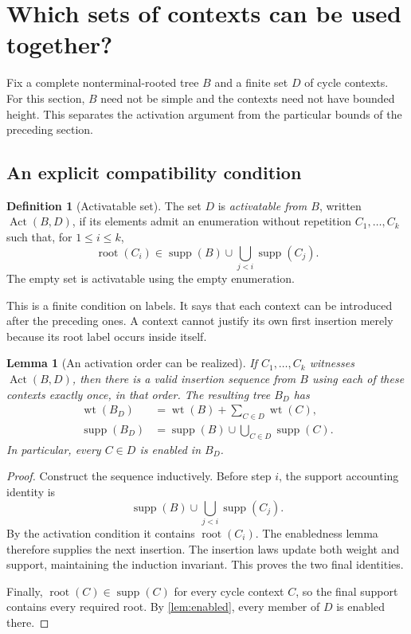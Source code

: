 \documentclass[11pt,a4paper]{article}
\numberwithin{equation}{section}
\theoremstyle{plain}
\newtheorem{lemma}[theorem]{Lemma}
\theoremstyle{definition}
\newtheorem{definition}[theorem]{Definition}
\theoremstyle{remark}
\newcommand{\wt}{\operatorname{wt}}
\newcommand{\supp}{\operatorname{supp}}
\newcommand{\rt}{\operatorname{root}}
\newcommand{\Act}{\operatorname{Act}}
\begin{document}
\section{Which sets of contexts can be used together?}\label{sec:activation}

Fix a complete nonterminal-rooted tree $B$ and a finite set $D$ of cycle contexts. For this section, $B$ need not be simple and the contexts need not have bounded height. This separates the activation argument from the particular bounds of the preceding section.

\subsection{An explicit compatibility condition}
\begin{definition}[Activatable set]\label{def:activation}
The set $D$ is \emph{activatable from $B$}, written $\Act(B,D)$, if its elements admit an enumeration without repetition $C_1,\ldots,C_k$ such that, for $1\leq i\leq k$,
\begin{equation}\label{eq:activation}
\rt(C_i)\in\supp(B)\cup\bigcup_{j<i}\supp(C_j).
\end{equation}
The empty set is activatable using the empty enumeration.
\end{definition}

This is a finite condition on labels. It says that each context can be introduced after the preceding ones. A context cannot justify its own first insertion merely because its root label occurs inside itself.

\begin{lemma}[An activation order can be realized]\label{lem:activation-realize}
If $C_1,\ldots,C_k$ witnesses $\Act(B,D)$, then there is a valid insertion sequence from $B$ using each of these contexts exactly once, in that order. The resulting tree $B_D$ has
\begin{align}
\wt(B_D)&=\wt(B)+\sum_{C\in D}\wt(C),\label{eq:activated-wt}\\
\supp(B_D)&=\supp(B)\cup\bigcup_{C\in D}\supp(C).\label{eq:activated-supp}
\end{align}
In particular, every $C\in D$ is enabled in $B_D$.
\end{lemma}
\begin{proof}
Construct the sequence inductively. Before step $i$, the support accounting identity is
\[
\supp(B)\cup\bigcup_{j<i}\supp(C_j).
\]
By the activation condition it contains $\rt(C_i)$. The enabledness lemma therefore supplies the next insertion. The insertion laws update both weight and support, maintaining the induction invariant. This proves the two final identities.

Finally, $\rt(C)\in\supp(C)$ for every cycle context $C$, so the final support contains every required root. By \cref{lem:enabled}, every member of $D$ is enabled there.
\end{proof}
\end{document}
